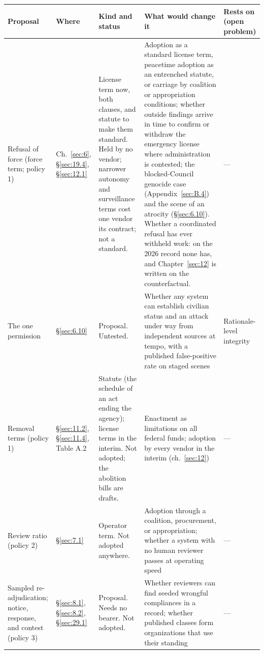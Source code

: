 
\begingroup\small\renewcommand{\arraystretch}{1.12}
\begin{longtable}{@{}>{\raggedright\arraybackslash}p{}>{\raggedright\arraybackslash}p{}>{\raggedright\arraybackslash}p{}>{\raggedright\arraybackslash}p{}>{\raggedright\arraybackslash}p{}@{}}
\hline
\textbf{Proposal} & \textbf{Where} & \textbf{Kind and status} & \textbf{What would change it} & \textbf{Rests on (open problem)} \\
\hline
\endhead
Refusal of force (force term; policy 1) & Ch.~\ref{sec:6}, \S\ref{sec:19.4}, \S\ref{sec:12.1} & License term now, both clauses, and statute to make them standard. Held by no vendor; narrower autonomy and surveillance terms cost one vendor its contract; not a standard. & Adoption as a standard license term, peacetime adoption as an entrenched statute, or carriage by coalition or appropriation conditions; whether outside findings arrive in time to confirm or withdraw the emergency license where administration is contested; the blocked-Council genocide case (Appendix~\ref{sec:B.4}) and the scene of an atrocity (\S\ref{sec:6.10}). Whether a coordinated refusal has ever withheld work: on the 2026 record none has, and Chapter~\ref{sec:12} is written on the counterfactual. & — \\ \hline
The one permission & \S\ref{sec:6.10} & Proposal. Untested. & Whether any system can establish civilian status and an attack under way from independent sources at tempo, with a published false-positive rate on staged scenes & Rationale-level integrity \\ \hline
Removal terms (policy 1) & \S\ref{sec:11.2}, \S\ref{sec:11.4}, Table A.2 & Statute (the schedule of an act ending the agency); license terms in the interim. Not adopted; the abolition bills are drafts. & Enactment as limitations on all federal funds; adoption by every vendor in the interim (ch.~\ref{sec:12}) & — \\ \hline
Review ratio (policy 2) & \S\ref{sec:7.1} & Operator term. Not adopted anywhere. & Adoption through a coalition, procurement, or appropriation; whether a system with no human reviewer passes at operating speed & — \\ \hline
Sampled re-adjudication; notice, response, and contest (policy 3) & \S\ref{sec:8.1}, \S\ref{sec:8.2}, \S\ref{sec:29.1} & Proposal. Needs no bearer. Not adopted. & Whether reviewers can find seeded wrongful compliances in a record; whether published classes form organizations that use their standing & — \\ \hline

\end{longtable}
